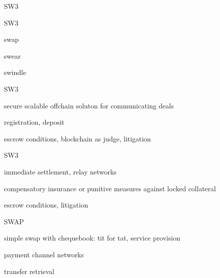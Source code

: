 \documentclass{beamer}
\begin{document}
\begin{section}{SW3}


\begin{frame}{SW3}
\begin{block}{}
swap
\end{block}
\begin{block}{}
swear
\end{block}
\begin{block}{}
swindle
\end{block}
\end{frame}

\begin{frame}{SW3}
\begin{block}{}
secure scalable offchain soluton for communicating deals
\end{block}
\begin{block}{}
registration, deposit
\end{block}
\begin{block}{}
escrow conditions, blockchain as judge, litigation
\end{block}
\end{frame}

\begin{frame}{SW3}
\begin{block}{}
immediate settlement, relay networks
\end{block}
\begin{block}{}
compensatory insurance or punitive measures against locked collateral
\end{block}
\begin{block}{}
escrow conditions, litigation
\end{block}
\end{frame}


\begin{frame}{SWAP}
\begin{block}{}
simple swap with chequebook: tit for tat, service provision
\end{block}
\begin{block}{}
payment channel networks
\end{block}
\begin{block}{}
transfer retrieval
\end{block}
\end{frame}

\end{section}
\end{document}
